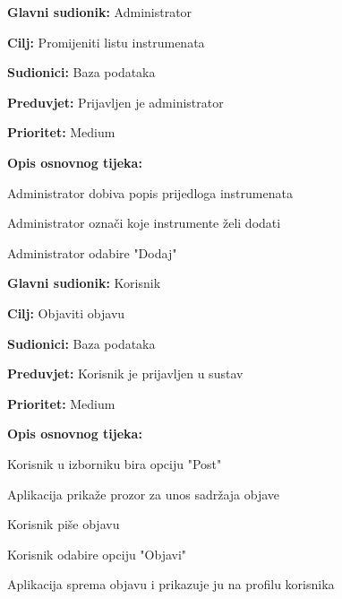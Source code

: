 \noindent {}
	\begin{packed_item}
		
		\item \textbf{Glavni sudionik:} Administrator
		\item \textbf{Cilj:} Promijeniti listu instrumenata
		\item \textbf{Sudionici:} Baza podataka
		\item \textbf{Preduvjet:} Prijavljen je administrator
		\item \textbf{Prioritet:} Medium
		\item \textbf{Opis osnovnog tijeka:}
		
		\item[] \begin{packed_enum}
			\item Administrator dobiva popis prijedloga instrumenata
			\item Administrator označi koje instrumente želi dodati
			\item Administrator odabire "Dodaj"
		\end{packed_enum}
		
	\end{packed_item}

\noindent {}
	\begin{packed_item}
		
		\item \textbf{Glavni sudionik: } Korisnik
		\item \textbf{Cilj:} Objaviti objavu
		\item \textbf{Sudionici:} Baza podataka
		\item \textbf{Preduvjet:} Korisnik je prijavljen u sustav
		\item \textbf{Prioritet:} Medium
		\item \textbf{Opis osnovnog tijeka:}
		
		\item[] \begin{packed_enum}
			
			\item Korisnik u izborniku bira opciju "Post"
			\item Aplikacija prikaže prozor za unos sadržaja objave
			\item Korisnik piše objavu
			\item Korisnik odabire opciju "Objavi"
			\item Aplikacija sprema objavu i prikazuje ju na profilu korisnika
		\end{packed_enum}
	\end{packed_item}

